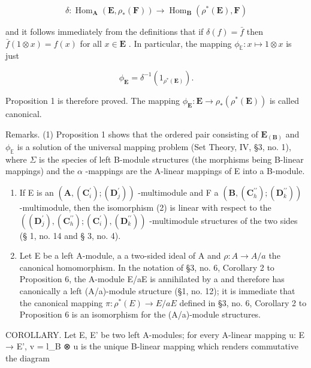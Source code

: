 \[
\delta : \operatorname{Hom} _ {\mathbf {A}} (\mathbf {E}, \rho_ {*} (\mathbf {F})) \rightarrow \operatorname{Hom} _ {\mathbf {B}} (\rho^ {*} (\mathbf {E}), \mathbf {F})\tag{2}
\]

and it follows immediately from the definitions that if \(\delta(f) = \bar{f}\) then \(\bar{f}(1 \otimes x) = f(x)\) for all \(x \in \mathbf{E}\) . In particular, the mapping \(\phi_{\mathbb{E}}: x \mapsto 1 \otimes x\) is just

\[
\phi_ {\mathbf {E}} = \delta^ {- 1} (1 _ {\rho^ {*} (\mathbf {E})}).\tag{3}
\]

Proposition 1 is therefore proved. The mapping \(\phi_{\mathbf{E}}: \mathbf{E} \to \rho_{*}(\rho^{*}(\mathbf{E}))\) is called canonical.

Remarks. (1) Proposition 1 shows that the ordered pair consisting of \(\mathbf{E}_{(\mathbf{B})}\) and \(\phi_{\mathbb{E}}\) is a solution of the universal mapping problem (Set Theory, IV, §3, no. 1), where \(\Sigma\) is the species of left B-module structures (the morphisms being B-linear mappings) and the \(\alpha\) -mappings are the A-linear mappings of E into a B-module.

\begin{enumerate}
\def\labelenumi{(\arabic{enumi})}
\setcounter{enumi}{1}
\item
  If E is an \((\mathbf{A}, (\mathbf{C}_{i}^{\prime}); (\mathbf{D}_{j}^{\prime}))\) -multimodule and F a \((\mathbf{B}, (\mathbf{C}_{h}^{\prime\prime}); (\mathbf{D}_{k}^{\prime\prime}))\) -multimodule, then the isomorphism (2) is linear with respect to the \(((\mathbf{D}_{j}^{\prime}), (\mathbf{C}_{h}^{\prime\prime}); (\mathbf{C}_{i}^{\prime}), (\mathbf{D}_{k}^{\prime\prime}))\) -multimodule structures of the two sides (§ 1, no. 14 and § 3, no. 4).
\item
  Let E be a left A-module, a a two-sided ideal of A and \(\rho:A\to A/a\) the canonical homomorphism. In the notation of §3, no. 6, Corollary 2 to Proposition 6, the A-module E/aE is annihilated by a and therefore has canonically a left (A/a)-module structure (§1, no. 12); it is immediate that the canonical mapping \(\pi:\rho^{*}(E)\to E/aE\) defined in §3, no. 6, Corollary 2 to Proposition 6 is an isomorphism for the (A/a)-module structures.
\end{enumerate}

COROLLARY. Let E, E' be two left A-modules; for every A-linear mapping u: E → E', v = l\_B ⊗ u is the unique B-linear mapping which renders commutative the diagram

